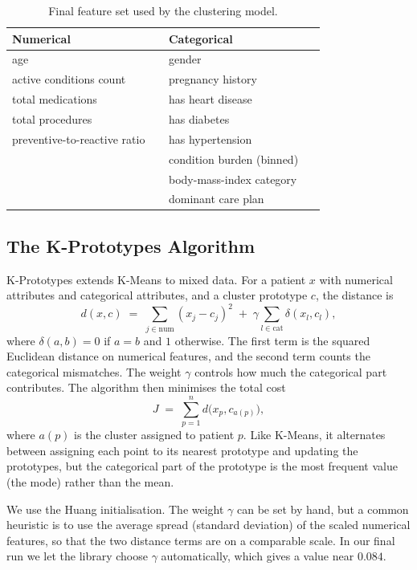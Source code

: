 \begin{table}[t]
\caption{Final feature set used by the clustering model.}
\label{tab:features}
\centering
\small
\begin{tabular}{@{}p{0.46\linewidth}p{0.46\linewidth}@{}}
\toprule
Numerical & Categorical \\
\midrule
age & gender \\
active conditions count & pregnancy history \\
total medications & has heart disease \\
total procedures & has diabetes \\
preventive-to-reactive ratio & has hypertension \\
 & condition burden (binned) \\
 & body-mass-index category \\
 & dominant care plan \\
\bottomrule
\end{tabular}
\end{table}

\subsection{The K-Prototypes Algorithm}

K-Prototypes \cite{huang1998kprototypes} extends K-Means to mixed data. For a patient $x$ with numerical attributes and categorical attributes, and a cluster prototype $c$, the distance is
\begin{equation}
d(x, c) \;=\; \sum_{j \in \text{num}} (x_j - c_j)^2 \;+\; \gamma \sum_{l \in \text{cat}} \delta(x_l, c_l),
\end{equation}
where $\delta(a,b)=0$ if $a=b$ and $1$ otherwise. The first term is the squared Euclidean distance on numerical features, and the second term counts the categorical mismatches. The weight $\gamma$ controls how much the categorical part contributes. The algorithm then minimises the total cost
\begin{equation}
J \;=\; \sum_{p=1}^{n} d\big(x_p, c_{a(p)}\big),
\end{equation}
where $a(p)$ is the cluster assigned to patient $p$. Like K-Means, it alternates between assigning each point to its nearest prototype and updating the prototypes, but the categorical part of the prototype is the most frequent value (the mode) rather than the mean.

We use the Huang initialisation. The weight $\gamma$ can be set by hand, but a common heuristic is to use the average spread (standard deviation) of the scaled numerical features, so that the two distance terms are on a comparable scale. In our final run we let the library choose $\gamma$ automatically, which gives a value near $0.084$.

